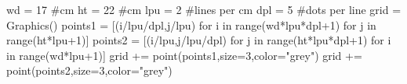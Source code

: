 \documentclass[12pt]{article}
\begin{document}
\begin{sagesilent}
wd = 17 #cm
ht = 22 #cm
lpu = 2 #lines per cm
dpl = 5 #dots per line
grid = Graphics()
points1 = [(i/lpu/dpl,j/lpu) for i in range(wd*lpu*dpl+1) for j in range(ht*lpu+1)]
points2 = [(i/lpu,j/lpu/dpl) for j in range(ht*lpu*dpl+1) for i in range(wd*lpu+1)]
grid += point(points1,size=3,color="grey")
grid += point(points2,size=3,color="grey")
\end{sagesilent}

\begin{center}
\end{center}

\newpage

\begin{center}
\end{center}
\end{document}
